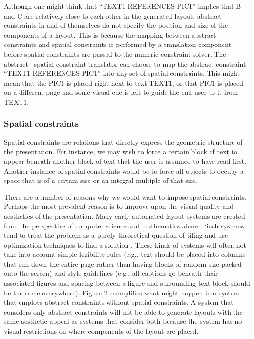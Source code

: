     Although one might think that “TEXT1 REFERENCES PIC1” implies that B and C are relatively close to each other in the generated layout, abstract constraints in and of themselves do not specify the position and size of the components of a layout. This is because the mapping between abstract constraints and spatial constraints is performed by a translation component before spatial constraints are passed to the numeric constraint solver. The abstract– spatial constraint translator can choose to map the abstract constraint “TEXT1 REFERENCES PIC1” into any set of spatial constraints. This might mean that the PIC1 is placed right next to text TEXT1, or that PIC1 is placed on a different page and some visual cue is left to guide the end user to it from TEXT1.

    \subsubsection{Spatial constraints}
		\label{spatialcon}

    Spatial constraints are relations that directly express the geometric structure of the presentation. For instance, we may wish to force a certain block of text to appear beneath another block of text that the user is assumed to have read first. Another instance of spatial constraints would be to force all objects to occupy a space that is of a certain size or an integral multiple of that size.

    There are a number of reasons why we would want to impose spatial constraints. Perhaps the most prevalent reason is to improve upon the visual quality and aesthetics of the presentation. Many early automated layout systems are created from the perspective of computer science and mathematics alone \citep{beach-1}. Such systems tend to treat the problem as a purely theoretical question of tiling and use optimization techniques to find a solution \citep{luders-1}. These kinds of systems will often not take into account simple legibility rules (e.g., text should be placed into columns that run down the entire page rather than having blocks of random size packed onto the screen) and style guidelines (e.g., all captions go beneath their associated figures and spacing between a figure and surrounding text block should be the same everywhere). Figure 2 exemplifies what might happen in a system that employs abstract constraints without spatial constraints. A system that considers only abstract constraints will not be able to generate layouts with the same aesthetic appeal as systems that consider both because the system has no visual restrictions on where components of the layout are placed.

